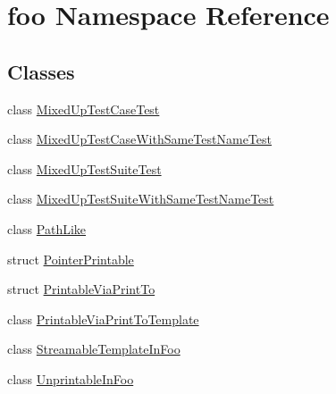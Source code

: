 \hypertarget{namespacefoo}{}\section{foo Namespace Reference}
\label{namespacefoo}
\subsection*{Classes}
\begin{DoxyCompactItemize}
\item 
class \mbox{\hyperlink{classfoo_1_1_mixed_up_test_case_test}{Mixed\+Up\+Test\+Case\+Test}}
\item 
class \mbox{\hyperlink{classfoo_1_1_mixed_up_test_case_with_same_test_name_test}{Mixed\+Up\+Test\+Case\+With\+Same\+Test\+Name\+Test}}
\item 
class \mbox{\hyperlink{classfoo_1_1_mixed_up_test_suite_test}{Mixed\+Up\+Test\+Suite\+Test}}
\item 
class \mbox{\hyperlink{classfoo_1_1_mixed_up_test_suite_with_same_test_name_test}{Mixed\+Up\+Test\+Suite\+With\+Same\+Test\+Name\+Test}}
\item 
class \mbox{\hyperlink{classfoo_1_1_path_like}{Path\+Like}}
\item 
struct \mbox{\hyperlink{structfoo_1_1_pointer_printable}{Pointer\+Printable}}
\item 
struct \mbox{\hyperlink{structfoo_1_1_printable_via_print_to}{Printable\+Via\+Print\+To}}
\item 
class \mbox{\hyperlink{classfoo_1_1_printable_via_print_to_template}{Printable\+Via\+Print\+To\+Template}}
\item 
class \mbox{\hyperlink{classfoo_1_1_streamable_template_in_foo}{Streamable\+Template\+In\+Foo}}
\item 
class \mbox{\hyperlink{classfoo_1_1_unprintable_in_foo}{Unprintable\+In\+Foo}}
\end{DoxyCompactItemize}

